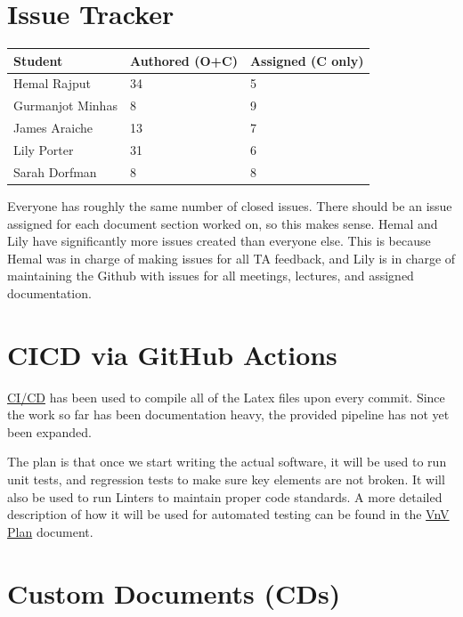 \documentclass{article}
\begin{document}
\section{Issue Tracker}

\begin{table}[H]
\centering
\begin{tabular}{lll}
\toprule
\textbf{Student} & \textbf{Authored (O+C)} & \textbf{Assigned (C only)}\\
\midrule
Hemal Rajput & 34 & 5 \\
Gurmanjot Minhas & 8 & 9 \\
James Araiche & 13 & 7 \\
Lily Porter & 31 & 6 \\
Sarah Dorfman & 8 & 8 \\
\bottomrule
\end{tabular}
\end{table}

Everyone has roughly the same number of closed issues. There should be 
an issue assigned for each document section worked on, so this makes sense.
Hemal and Lily have significantly more issues created than everyone else. This
is because Hemal was in charge of making issues for all TA feedback, and Lily
is in charge of maintaining the Github with issues for all meetings, lectures, 
and assigned documentation.  

\section{CICD via GitHub Actions}

\href{https://github.com/lilyporter/Ghoti/tree/main/.github/workflows}{CI/CD} has been used to compile all of the Latex files upon every commit. Since the work so far has been documentation heavy, the provided pipeline has not yet been expanded. 

The plan is that once we start writing the actual software, it will be used to run unit tests, and regression tests to make sure key elements are not broken. It will also be used to run Linters to maintain proper code standards. A more detailed description of how it will be used for automated testing can be found in the \href{https://github.com/lilyporter/Ghoti/blob/main/pdfs/VnVPlan/VnVPlan.pdf}{VnV Plan} document. 


\section{Custom Documents (CDs)}
\end{document}

